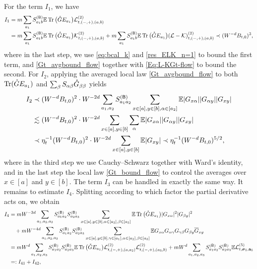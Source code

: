 For the term $I_1$, we have
\begin{align}
I_1&= m \sum_{a_1}S^{({\mathsf{B}})}_{a_1 b} \mathbb{E} \operatorname{Tr} \big({\mathring G} E_{a_1} \big)\mathcal L^{(2)}_{t,(-,+),(a,b)} \nonumber\\
&=m \sum_{a_1}S^{({\mathsf{B}})}_{a_1 b} \mathbb{E} \operatorname{Tr} \big({\mathring G} E_{a_1} \big)\mathcal K^{(2)}_{t,(-,+),(a,b)} +  m \sum_{a_1}S^{({\mathsf{B}})}_{a_1 b} \mathbb{E} \operatorname{Tr} \big({\mathring G} E_{a_1} \big) (\mathcal L-\mathcal K)^{(2)}_{t,(-,+),(a,b)} \prec (W^{-d}B_{t,0})^3, \label{eq:termI1}
\end{align}
where in the last step, we use \eqref{eq:bcal_k} and \eqref{res_ELK_n=1} to bound the first term, and \eqref{Gt_avgbound_flow} together with \eqref{Eq:L-KGt-flow} to bound the second.
For $I_2$, applying the averaged local law \eqref{Gt_avgbound_flow} to both $\operatorname{Tr}( {\mathring G} E_{a_1} )$ and $\sum_\beta S_{\alpha\beta} {\mathring G}_{\beta\beta}$ yields
\begin{align}
    I_2&\prec (W^{-d}B_{t,0})^2 \cdot W^{-2d}\sum_{a_1, a_2}S^{({\mathsf{B}})}_{a_1a_2} \sum_{x\in [a],y\in [b],\alpha \in [a_2]}\mathbb{E}  |G_{x\alpha}||G_{\alpha y}| |G_{xy}| \nonumber\\
    &\lesssim (W^{-d}B_{t,0})^2 \cdot W^{-2d}\sum_{x\in [a],y\in [b]} \sum_\alpha \mathbb{E}  |G_{x\alpha}||G_{\alpha y}| |G_{xy}| \nonumber\\
    &\prec \eta_t^{-1}(W^{-d}B_{t,0})^2 \cdot W^{-2d}\sum_{x\in [a],y\in [b]}\mathbb{E}|G_{xy}| \prec \eta_t^{-1}(W^{-d}B_{t,0})^{5/2},\label{eq:termI2}
\end{align}
where in the third step we use Cauchy--Schwarz together with Ward's identity, and in the last step the local law \eqref{Gt_bound_flow} to control the averages over $x\in[a]$ and $y\in[b]$. The term $I_3$ can be handled in exactly the same way. It remains to estimate $I_4$. Splitting according to which factor the partial derivative acts on, we obtain
\begin{align*}
I_4&=m W^{-3d}\sum_{a_1, a_2,a_3}S^{({\mathsf{B}})}_{a_1a_2}S^{({\mathsf{B}})}_{a_2a_3} \sum_{x\in [a],y\in [b],\alpha \in [a_2],\beta\in[a_3]}  \mathbb{E}  \operatorname{Tr}\big( {\mathring G} E_{a_1} \big) |G_{x\alpha}|^2 |G_{\beta y}|^2 \\
&\quad +m W^{-4d}\sum_{a_1, a_2, a_3}S^{({\mathsf{B}})}_{a_1a_2}S^{({\mathsf{B}})}_{a_2a_3} \sum_{x\in [a],y\in [b],\gamma\in[a_1],\alpha \in [a_2],\beta\in[a_3]} \mathbb{E}       
 G_{x\alpha }G_{\alpha\gamma}G_{\gamma\beta}G_{\beta y}  \overline G_{xy} \\
&= mW^d\sum_{a_1, a_2,a_3}S^{({\mathsf{B}})}_{a_1a_2}S^{({\mathsf{B}})}_{a_2a_3} \mathbb{E}  \operatorname{Tr}\big( {\mathring G} E_{a_1} \big) \mathcal L^{(2)}_{t,(-,+),(a,a_2)}\mathcal L^{(2)}_{t,(-,+),(a_3,b)} +mW^d \sum_{a_1, a_2, a_3}S^{({\mathsf{B}})}_{a_1a_2}S^{({\mathsf{B}})}_{a_2a_3} \mathbb{E} \mathcal L^{(5)}_{t,{\boldsymbol{\sigma}}_5,{\mathbf{a}}_5} \\
&=:I_{41}+I_{42},
\end{align*}

